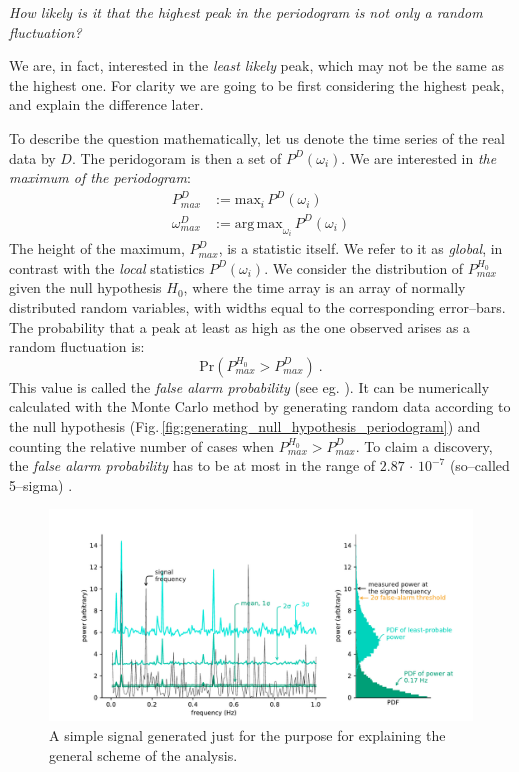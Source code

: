 \begin{center}
  \emph{How likely is it that the highest peak in the periodogram is not only a random fluctuation?}
\end{center}

We are, in fact, interested in the \emph{least likely} peak, which may not be the same as the highest one. For clarity we are going to be first considering the highest peak, and explain the difference later.

To describe the question mathematically, let us denote the time series of the real data by $D$. The peridogoram is then a set of $P^D(\omega_i)$. We are interested in \emph{the maximum of the periodogram}:
\begin{align}
  P_{max}^D &:= \mathrm{max}_i\,P^D(\omega_i) \\
  \omega_{max}^D &:= \mathrm{arg\,max}_{\omega_i}\,P^D(\omega_i)
\end{align}
The height of the maximum, $P_{max}^D$, is a statistic itself. We refer to it as \emph{global}, in contrast with the \emph{local} statistics $P^D(\omega_i)$. We consider the distribution of $P_{max}^{H_0}$ given the null hypothesis $H_0$, where the time array is an array of normally distributed random variables, with widths equal to the corresponding error--bars. The probability that a peak at least as high as the one observed arises as a random fluctuation is:
\begin{equation}
  \mathrm{Pr}\left( P_{max}^{H_0} > P_{max}^D \right) \ .
\end{equation}
This value is called the \emph{false alarm probability} (see eg. \cite{Pandola2004}). It can be numerically calculated with the Monte Carlo method by generating random data according to the null hypothesis (Fig.\,\ref{fig:generating_null_hypothesis_periodogram}) and counting the relative number of cases when $P_{max}^{H_0} > P_{max}^D$. To claim a discovery, the \emph{false alarm probability} has to be at most in the range of $2.87\,\cdot\,10^{-7}$ (so--called 5--sigma) \cite{PDG2014}.

\begin{figure}
  \centering \includegraphics[width=\linewidth]{gfx/axions/basic_detection.pdf}
  \caption{A simple signal generated just for the purpose for explaining the general scheme of the analysis.}
  \label{fig:basic_detection}
\end{figure}

